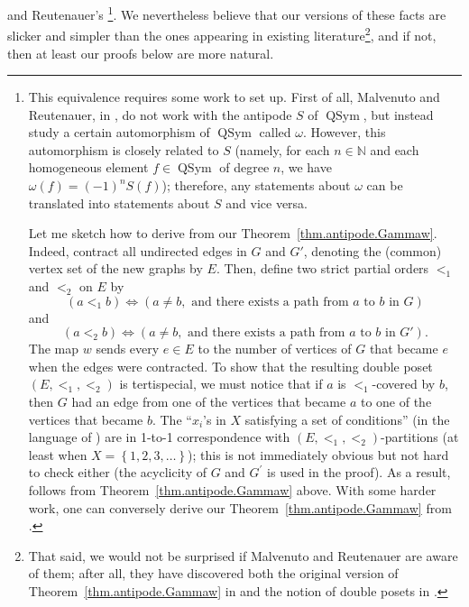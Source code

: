 \documentclass[numbers=enddot,12pt,final,onecolumn,notitlepage,abstracton]{scrartcl}%
\theoremstyle{definition}
\newcommand{\QSym}{{\operatorname{QSym}}}
\newcommand{\NN}{{\mathbb{N}}}
\begin{document}
and Reutenauer's \cite[Theorem 3.1]{Mal-Reu}\footnote{This equivalence
requires some work to set up. First of all, Malvenuto and
Reutenauer, in \cite{Mal-Reu}, do not work with the antipode $S$
of $\QSym$, but instead study a certain automorphism of
$\QSym$ called $\omega$. However, this automorphism is closely
related to $S$ (namely, for each $n \in \NN$ and each homogeneous
element $f \in \QSym$ of degree $n$, we have
$\omega\left(f\right) = \left(-1\right)^n S\left(f\right)$);
therefore, any statements about $\omega$ can be translated into
statements about $S$ and vice versa.
\par
Let me sketch how to derive \cite[Theorem 3.1]{Mal-Reu}
from our Theorem~\ref{thm.antipode.Gammaw}. Indeed, contract
all undirected edges in $G$ and $G'$,
denoting the (common) vertex set of the new graphs by $E$.
Then, define two strict partial orders $<_1$ and
$<_2$ on $E$ by
\[
\left(a <_1 b\right) \Longleftrightarrow \left(a \neq b,
\text{ and there exists a path from } a \text{ to } b \text{ in }
G \right)
\]
and
\[
\left(a <_2 b\right) \Longleftrightarrow \left(a \neq b,
\text{ and there exists a path from } a \text{ to } b \text{ in }
G' \right) .
\]
The map $w$ sends every $e \in E$ to the number of vertices
of $G$ that became $e$ when the edges were contracted. To show that
the resulting double poset $\left(E, <_1, <_2\right)$ is
tertispecial, we must notice that if $a$ is $<_1$-covered by $b$,
then $G$ had an edge from one of the vertices that became $a$ to
one of the vertices that became $b$. The ``$x_i$'s in $X$
satisfying a set of conditions'' (in the language of
\cite[Section 3]{Mal-Reu}) are in 1-to-1 correspondence with
$\left(E, <_1, <_2\right)$-partitions (at least when
$X = \left\{1, 2, 3, \ldots\right\}$); this is not immediately
obvious but not hard to check either (the acyclicity of $G$ and
$G^\prime$ is used in the proof). As a result,
\cite[Theorem 3.1]{Mal-Reu} follows from
Theorem~\ref{thm.antipode.Gammaw} above.
With some harder work, one can conversely derive
our Theorem~\ref{thm.antipode.Gammaw} from
\cite[Theorem 3.1]{Mal-Reu}.}. We
nevertheless believe that our versions of these facts are
slicker and simpler than the ones appearing in existing
literature\footnote{That said, we would not be surprised if
Malvenuto and Reutenauer are aware of them; after all, they have
discovered both the original
version of Theorem~\ref{thm.antipode.Gammaw} in
\cite{Mal-Reu} and the notion of double posets in \cite{Mal-Reu-DP}.},
and if not,
then at least our proofs below are more natural.
\end{document}
